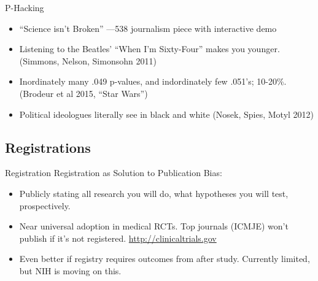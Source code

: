 \documentclass{beamer}
\begin{document}
\begin{frame}{P-Hacking}
\begin{itemize}
\item
``Science isn't Broken'' ---538 journalism piece with interactive demo \href{http://fivethirtyeight.com/features/science-isnt-broken}{}
\item
Listening to the Beatles' ``When I'm Sixty-Four'' makes you younger. (Simmons, Nelson, Simonsohn 2011)
\item
Inordinately many .049 p-values, and indordinately few .051's; 10-20\%. (Brodeur et al 2015, ``Star Wars'')
\item 
Political ideologues literally see in black and white (Nosek, Spies, Motyl 2012)
\end{itemize}

\end{frame}

\subsection*{Registrations}
\begin{frame}{Registration}
Registration as Solution to Publication Bias:
 \begin{itemize}
  \item
   Publicly stating all research you will do, what hypotheses you will test, prospectively.
  \item
   Near universal adoption in medical RCTs. Top journals (ICMJE) won't publish if it's not registered. \url{http://clinicaltrials.gov}
  \item
   Even better if registry requires outcomes from after study. Currently limited, but NIH is moving on this.
\end{itemize}
\end{frame}
\end{document}
